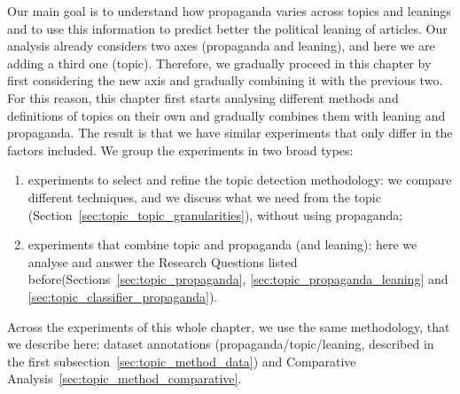 Our main goal is to understand how propaganda varies across topics and leanings and to use this information to predict better the political leaning of articles.
Our analysis already considers two axes (propaganda and leaning), and here we are adding a third one (topic).
Therefore, we gradually proceed in this chapter by first considering the new axis and gradually combining it with the previous two.
For this reason, this chapter first starts analysing different methods and definitions of topics on their own and gradually combines them with leaning and propaganda. The result is that we have similar experiments that only differ in the factors included.
We group the experiments in two broad types:
\begin{enumerate}
    \item experiments to select and refine the topic detection methodology: we compare different techniques, and we discuss what we need from the topic (Section~\ref{sec:topic_topic_granularities}), without using propaganda; 
    \item experiments that combine topic and propaganda (and leaning): here we analyse and answer the Research Questions listed before(Sections~\ref{sec:topic_propaganda}, \ref{sec:topic_propaganda_leaning} and \ref{sec:topic_classifier_propaganda}).
\end{enumerate}




Across the experiments of this whole chapter, we use the same methodology, that we describe here: dataset annotations (propaganda/topic/leaning, described in the first subsection~\ref{sec:topic_method_data}) and Comparative Analysis~\ref{sec:topic_method_comparative}.


